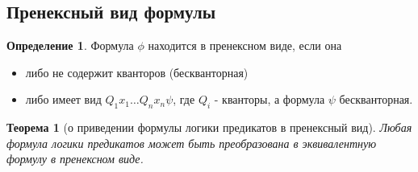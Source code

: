 \documentclass[a4paper]{article}
\newtheorem{theorem}{Теорема}[section]
\theoremstyle{definition}
\newtheorem*{definition}{Определение}
\theoremstyle{remark}
\begin{document}
    \subsection{Пренексный вид формулы}
    \begin{definition}
        Формула $\phi$ находится в пренексном виде, если она 
        \begin{itemize}
            \item либо не содержит кванторов (бескванторная)
            \item либо имеет вид $Q_1 x_1\dots Q_n x_n \psi$, где $Q_i$ - кванторы, а формула $\psi$ бескванторная.
        \end{itemize}
    \begin{theorem}[о приведении формулы логики предикатов в пренексный вид]
        Любая формула логики предикатов может быть преобразована в эквивалентную формулу в пренексном виде.
    \end{theorem}
    \end{definition}
\end{document}
